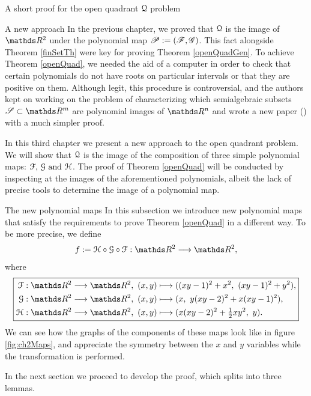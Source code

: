 \documentclass[11pt, a4paper, english, twoside, notitlepage, openright]{report}
\begin{document}
\begin{chapter}{A short proof for the open quadrant $\mathcal{Q}$ problem}
\begin{section}{A new approach}
In the previous chapter, we proved that $\mathcal{Q}$ is the image of $\R^2$ under the polynomial map $\mathscr{P}:=(\mathscr{F},\mathscr{G})$. This fact alongside Theorem \ref{finSetTh} were key for proving Theorem \ref{openQuadGen}. To achieve Theorem \ref{openQuad}, we needed the aid of a computer in order to check that certain polynomials do not have roots on particular intervals or that they are positive on them. Although legit, this procedure is controversial, and the authors kept on working on the problem of characterizing which semialgebraic subsets $\mathscr{S} \subset \R^m$ are polynomial images of $\R^n$ and wrote a new paper (\cite{fu}) with a much simpler proof.

In this third chapter we present a new approach to the open quadrant problem. We will show that $\mathcal{Q}$ is the image of the composition of three simple polynomial maps: $\mathcal{F},\, \mathcal{G} \text{ and } \mathcal{H}$. The proof of Theorem \ref{openQuad} will be conducted by inspecting at the images of the aforementioned polynomials, albeit the lack of precise tools to determine the image of a polynomial map.

\begin{subsection}{The new polynomial maps}
In this subsection we introduce new polynomial maps that satisfy the requirements to prove Theorem \ref{openQuad} in a different way. To be more precise, we define 
$$
f:=\HH\circ\GG\circ\FF:\R^2\longrightarrow \R^2,
$$
where
\begin{equation*}
\boxed{
\begin{aligned}
\FF:\R^2\longrightarrow \R^2,\ (x,y)&\longmapsto((xy-1)^2+x^2,\ (xy-1)^2+y^2), \\
\GG:\R^2\longrightarrow \R^2,\ (x,y)&\longmapsto(x,\ y(xy-2)^2+x(xy-1)^2), \\
\HH:\R^2\longrightarrow \R^2,\ (x,y)&\longmapsto(x(xy-2)^2+\tfrac{1}{2}xy^2,\ y). \\
\end{aligned}
}
\end{equation*}
We can see how the graphs of the components of these maps look like in figure \ref{fig:ch2Maps}, and appreciate the symmetry between the $x$ and $y$ variables while the transformation is performed.

In the next section we proceed to develop the proof, which splits into three lemmas.


\end{subsection}
\end{section}
\end{chapter}
\end{document}
